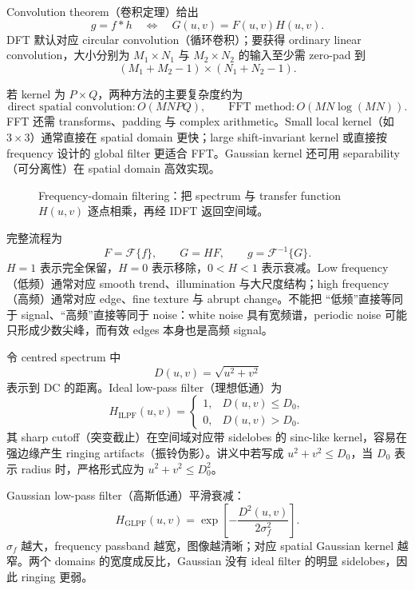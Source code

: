 Convolution theorem（卷积定理）给出
\[
  g=f*h
  \quad\Longleftrightarrow\quad
  \boxed{G(u,v)=F(u,v)H(u,v)}.
\]
DFT 默认对应 circular convolution（循环卷积）；要获得 ordinary linear convolution，大小分别为 $M_1\times N_1$ 与 $M_2\times N_2$ 的输入至少需 zero-pad 到
\[
  (M_1+M_2-1)\times(N_1+N_2-1).
\]

若 kernel 为 $P\times Q$，两种方法的主要复杂度约为
\[
  \text{direct spatial convolution}: O(MNPQ),\qquad
  \text{FFT method}: O(MN\log(MN)).
\]
FFT 还需 transforms、padding 与 complex arithmetic。Small local kernel（如 $3\times3$）通常直接在 spatial domain 更快；large shift-invariant kernel 或直接按 frequency 设计的 global filter 更适合 FFT。Gaussian kernel 还可用 separability（可分离性）在 spatial domain 高效实现。


\begin{figure}[htbp]
  \centering
  \resizebox{0.99\textwidth}{!}{}
  \caption{Frequency-domain filtering：把 spectrum 与 transfer function $H(u,v)$ 逐点相乘，再经 IDFT 返回空间域。}
  \label{fig:sc4061-l04-frequency-pipeline}
\end{figure}

完整流程为
\[
  F=\mathcal F\{f\},\qquad
  G=HF,\qquad
  g=\mathcal F^{-1}\{G\}.
\]
$H=1$ 表示完全保留，$H=0$ 表示移除，$0<H<1$ 表示衰减。Low frequency（低频）通常对应 smooth trend、illumination 与大尺度结构；high frequency（高频）通常对应 edge、fine texture 与 abrupt change。不能把 ``低频''直接等同于 signal、``高频''直接等同于 noise：white noise 具有宽频谱，periodic noise 可能只形成少数尖峰，而有效 edges 本身也是高频 signal。


令 centred spectrum 中
\[
  D(u,v)=\sqrt{u^2+v^2}
\]
表示到 DC 的距离。Ideal low-pass filter（理想低通）为
\[
  H_{\mathrm{ILPF}}(u,v)=
  \begin{cases}1,&D(u,v)\le D_0,\\0,&D(u,v)>D_0.\end{cases}
\]
其 sharp cutoff（突变截止）在空间域对应带 sidelobes 的 sinc-like kernel，容易在强边缘产生 ringing artifacts（振铃伪影）。讲义中若写成 $u^2+v^2\le D_0$，当 $D_0$ 表示 radius 时，严格形式应为 $u^2+v^2\le D_0^2$。

Gaussian low-pass filter（高斯低通）平滑衰减：
\[
  \boxed{H_{\mathrm{GLPF}}(u,v)=
  \exp\!\left[-\frac{D^2(u,v)}{2\sigma_f^2}\right]}.
\]
$\sigma_f$ 越大，frequency passband 越宽，图像越清晰；对应 spatial Gaussian kernel 越窄。两个 domains 的宽度成反比，Gaussian 没有 ideal filter 的明显 sidelobes，因此 ringing 更弱。

